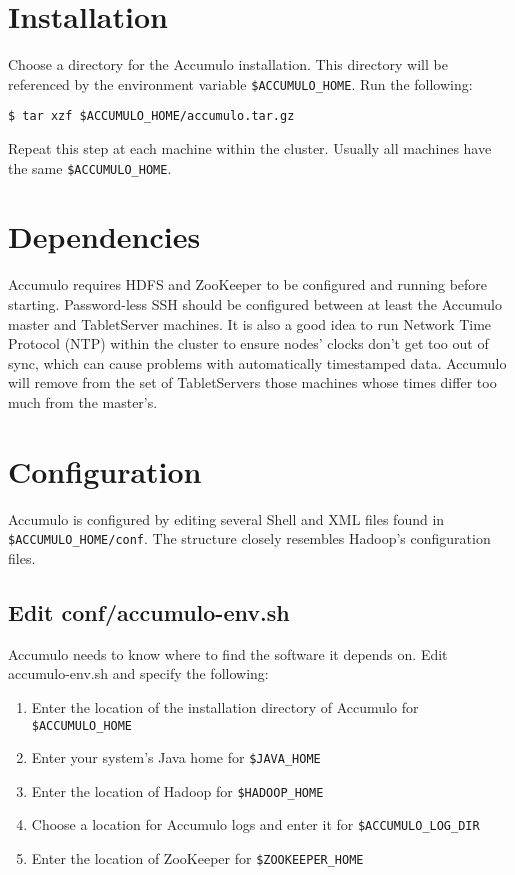 \section{Installation}
Choose a directory for the Accumulo installation. This directory will be referenced
by the environment variable \texttt{\$ACCUMULO\_HOME}. Run the following:

\small
\begin{verbatim}
$ tar xzf $ACCUMULO_HOME/accumulo.tar.gz
\end{verbatim}
\normalsize

Repeat this step at each machine within the cluster. Usually all machines have the
same \texttt{\$ACCUMULO\_HOME}.

\section{Dependencies}
Accumulo requires HDFS and ZooKeeper to be configured and running
before starting. Password-less SSH should be configured between at least the
Accumulo master and TabletServer machines. It is also a good idea to run Network
Time Protocol (NTP) within the cluster to ensure nodes' clocks don't get too out of
sync, which can cause problems with automatically timestamped data. Accumulo
will remove from the set of TabletServers those machines whose times differ too
much from the master's.

\section{Configuration}

Accumulo is configured by editing several Shell and XML files found in
\texttt{\$ACCUMULO\_HOME/conf}. The structure closely resembles Hadoop's configuration
files.

\subsection{Edit conf/accumulo-env.sh}

Accumulo needs to know where to find the software it depends on. Edit accumulo-env.sh 
and specify the following:

\begin{enumerate}
\item{Enter the location of the installation directory of Accumulo for \texttt{\$ACCUMULO\_HOME}}
\item{Enter your system's Java home for \texttt{\$JAVA\_HOME}}
\item{Enter the location of Hadoop for \texttt{\$HADOOP\_HOME}}
\item{Choose a location for Accumulo logs and enter it for \texttt{\$ACCUMULO\_LOG\_DIR}}
\item{Enter the location of ZooKeeper for \texttt{\$ZOOKEEPER\_HOME}}
\end{enumerate}


